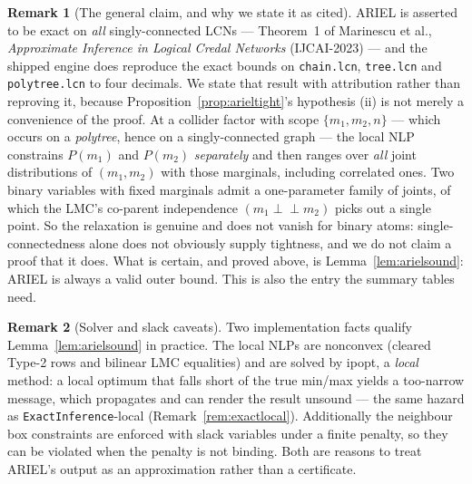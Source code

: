 \documentclass[11pt]{article}
\theoremstyle{definition}
\newtheorem{remark}{Remark}
\newcommand{\indep}{\perp\!\!\!\perp}
\begin{document}
\begin{remark}[The general claim, and why we state it as cited]\label{rem:arielcited}
ARIEL is asserted to be exact on \emph{all} singly-connected LCNs --- Theorem~1 of Marinescu et al.,
\emph{Approximate Inference in Logical Credal Networks} (IJCAI-2023) --- and the shipped engine does
reproduce the exact bounds on \texttt{chain.lcn}, \texttt{tree.lcn} and \texttt{polytree.lcn} to four
decimals. We state that result with attribution rather than reproving it, because
Proposition~\ref{prop:arieltight}'s hypothesis (ii) is not merely a convenience of the proof.
At a collider factor with scope $\{m_1,m_2,n\}$ --- which occurs on a \emph{polytree}, hence on a
singly-connected graph --- the local NLP constrains $P(m_1)$ and $P(m_2)$ \emph{separately} and then
ranges over \emph{all} joint distributions of $(m_1,m_2)$ with those marginals, including correlated
ones. Two binary variables with fixed marginals admit a one-parameter family of joints, of which the
LMC's co-parent independence $(m_1\indep m_2)$ picks out a single point. So the relaxation is genuine
and does not vanish for binary atoms: single-connectedness alone does not obviously supply tightness,
and we do not claim a proof that it does. What is certain, and proved above, is
Lemma~\ref{lem:arielsound}: ARIEL is always a valid outer bound. This is also the entry the summary
tables need.
\end{remark}

\begin{remark}[Solver and slack caveats]\label{rem:arielsolver}
Two implementation facts qualify Lemma~\ref{lem:arielsound} in practice. The local NLPs are nonconvex
(cleared Type-2 rows and bilinear LMC equalities) and are solved by ipopt, a \emph{local} method: a
local optimum that falls short of the true min/max yields a too-narrow message, which propagates and
can render the result unsound --- the same hazard as \texttt{ExactInference}-local
(Remark~\ref{rem:exactlocal}). Additionally the neighbour box constraints are enforced with slack
variables under a finite penalty, so they can be violated when the penalty is not binding. Both are
reasons to treat ARIEL's output as an approximation rather than a certificate.
\end{remark}
\end{document}
